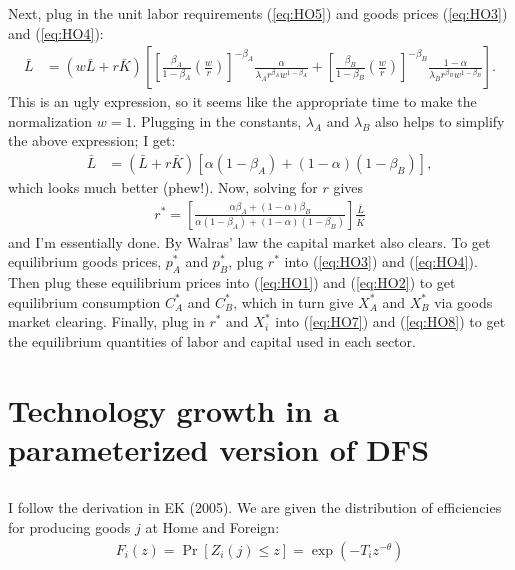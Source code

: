 \documentclass[12pt]{article}
\begin{document}
Next, plug in the unit labor requirements (\ref{eq:HO5}) and goods prices (\ref{eq:HO3}) and (\ref{eq:HO4}):
\begin{align*}
 \bar L&= (w\bar L + r\bar K)\left[\left[ \frac{\beta_A}{1-\beta_A}\left(\frac{w}{r}\right)\right]^{-\beta_A} \frac{\alpha}{\lambda_A r^{\beta_A}w^{1-\beta_A} } + \left[ \frac{\beta_B}{1-\beta_B}\left(\frac{w}{r}\right)\right]^{-\beta_B}  \frac{1-\alpha}{\lambda_B r^{\beta_B}w^{1-\beta_B} }\right].
\end{align*}
This is an ugly expression, so it seems like the appropriate time to make the normalization $w = 1$. Plugging in the constants, $\lambda_A$ and $\lambda_B$ also helps to simplify the above expression; I get:
\begin{align*}
 \bar L&= (\bar L + r\bar K)\left[\alpha(1-\beta_A) + (1-\alpha)(1-\beta_B)\right],
\end{align*}
which looks much better (phew!). Now, solving for $r$ gives
\begin{align}
r^* = \left[\frac{\alpha\beta_A + (1-\alpha)\beta_B}{\alpha(1-\beta_A) + (1-\alpha)(1-\beta_B)}\right] \frac{\bar L}{\bar K} \label{eq:12}
\end{align}
and I'm essentially done. By Walras' law the capital market also clears. To get equilibrium goods prices, $p^*_A$ and $p^*_B$, plug $r^*$ into (\ref{eq:HO3}) and (\ref{eq:HO4}). Then plug these equilibrium prices into (\ref{eq:HO1}) and (\ref{eq:HO2}) to get equilibrium consumption $C_A^*$ and $C_B^*$, which in turn give $X_A^*$ and $X_B^*$ via goods market clearing. Finally, plug in $r^*$ and $X_i^*$ into (\ref{eq:HO7}) and (\ref{eq:HO8}) to get the equilibrium quantities of labor and capital used in each sector.

\newpage

\section{Technology growth in a parameterized version of DFS}

\subsection{}
I follow the derivation in EK (2005). We are given the distribution of efficiencies for producing goods $j$ at Home and Foreign:
\begin{align*}
F_i(z)=\Pr[Z_i(j) \leq z ] = \exp(-T_iz^{-\theta})
\end{align*}

\iffalse
Now, if we pick some random $j \in [0,1]$, the probability distribution of its efficiency, $Z_i(j)$, is obviously same as above. Accordingly, we can order goods such that
\begin{align*}
j &= \exp(-T_iz_i(j)^{-\theta})\\
\implies z_i(j) &= \left(-\frac{T_i}{\ln j}\right)^{-1/\theta}.
\end{align*}
(Essentially, think of the index $j$ as the vertical axis of the CDF above).\\
\fi
\end{document}
